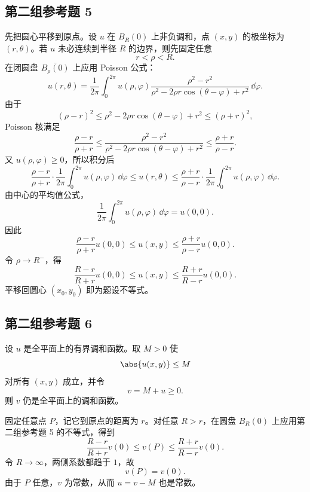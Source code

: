 \subsection*{第二组参考题 5}
\begin{xsolution}
先把圆心平移到原点。设 $u$ 在 $B_R(0)$ 上非负调和，点 $(x,y)$ 的极坐标为 $(r,\theta)$。若 $u$ 未必连续到半径 $R$ 的边界，则先固定任意
\[
  r<\rho<R.
\]
在闭圆盘 $\overline{B_\rho(0)}$ 上应用 Poisson 公式：
\[
  u(r,\theta)=\frac1{2\pi}\int_0^{2\pi}
  u(\rho,\varphi)
  \frac{\rho^2-r^2}{\rho^2-2\rho r\cos(\theta-\varphi)+r^2}\,\dd\varphi.
\]
由于
\[
  (\rho-r)^2
  \le \rho^2-2\rho r\cos(\theta-\varphi)+r^2
  \le(\rho+r)^2,
\]
Poisson 核满足
\[
  \frac{\rho-r}{\rho+r}
  \le
  \frac{\rho^2-r^2}{\rho^2-2\rho r\cos(\theta-\varphi)+r^2}
  \le
  \frac{\rho+r}{\rho-r}.
\]
又 $u(\rho,\varphi)\ge0$，所以积分后
\[
  \frac{\rho-r}{\rho+r}\cdot
  \frac1{2\pi}\int_0^{2\pi}u(\rho,\varphi)\,\dd\varphi
  \le u(r,\theta)
  \le
  \frac{\rho+r}{\rho-r}\cdot
  \frac1{2\pi}\int_0^{2\pi}u(\rho,\varphi)\,\dd\varphi.
\]
由中心的平均值公式，
\[
  \frac1{2\pi}\int_0^{2\pi}u(\rho,\varphi)\,\dd\varphi=u(0,0).
\]
因此
\[
  \frac{\rho-r}{\rho+r}u(0,0)
  \le u(x,y)\le
  \frac{\rho+r}{\rho-r}u(0,0).
\]
令 $\rho\to R^-$，得
\[
  \frac{R-r}{R+r}u(0,0)
  \le u(x,y)\le
  \frac{R+r}{R-r}u(0,0).
\]
平移回圆心 $(x_0,y_0)$ 即为题设不等式。
\end{xsolution}

\subsection*{第二组参考题 6}
\begin{xsolution}
设 $u$ 是全平面上的有界调和函数。取 $M>0$ 使
\[
  \abs{u(x,y)}\le M
\]
对所有 $(x,y)$ 成立，并令
\[
  v=M+u\ge0.
\]
则 $v$ 仍是全平面上的调和函数。

固定任意点 $P$，记它到原点的距离为 $r$。对任意 $R>r$，在圆盘 $B_R(0)$ 上应用第二组参考题 5 的不等式，得到
\[
  \frac{R-r}{R+r}v(0)
  \le v(P)\le
  \frac{R+r}{R-r}v(0).
\]
令 $R\to\infty$，两侧系数都趋于 $1$，故
\[
  v(P)=v(0).
\]
由于 $P$ 任意，$v$ 为常数，从而 $u=v-M$ 也是常数。
\end{xsolution}
